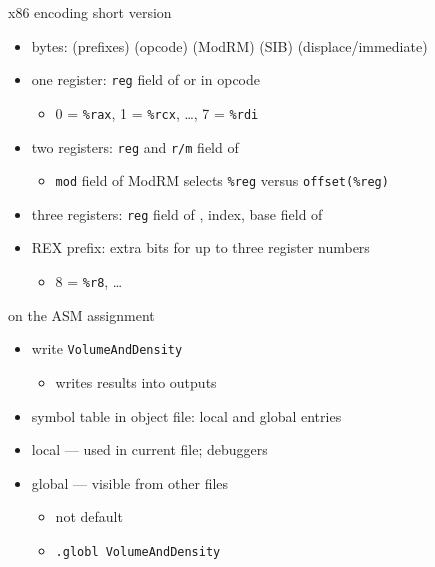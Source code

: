 \begin{frame}{x86 encoding short version}
    \begin{itemize}
    \item bytes: {\fontsize{9}{10}\selectfont (prefixes) (opcode) (ModRM) (SIB) (displace/immediate)}
    \item one register: {\tt reg} field of  or in opcode
        \begin{itemize}
        \item 0 = {\tt \%rax}, 1 = {\tt \%rcx}, \ldots, 7 = {\tt \%rdi}
        \end{itemize}
    \item two registers: {\tt reg} and {\tt r/m} field of 
        \begin{itemize}
        \item {\tt mod} field of ModRM selects {\tt \%reg} versus {\tt offset(\%reg)}
        \end{itemize}
    \item three registers: {\tt reg} field of , index, base field of 
    \item REX prefix: extra bits for up to three register numbers
        \begin{itemize}
        \item 8 = {\tt \%r8}, \ldots
        \end{itemize}
    \end{itemize}
\end{frame}

\begin{frame}{on the ASM assignment}
    \begin{itemize}
    \item write {\tt VolumeAndDensity}
        \begin{itemize}
        \item writes results into  outputs
        \end{itemize}
    \item symbol table in object file: local and global entries
    \item local --- used in current file; debuggers
    \item global --- visible from other files
        \begin{itemize}
        \item not default
        \item {\tt .globl VolumeAndDensity}
        \end{itemize}
    \end{itemize}
\end{frame}

